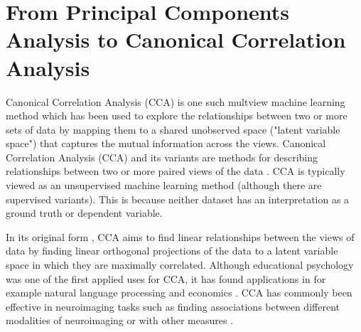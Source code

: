 

\section{From Principal Components Analysis to Canonical Correlation Analysis}

Canonical Correlation Analysis (CCA) \cite{hotelling1935canonical} is one such multview machine learning method which has been used to explore the relationships between two or more sets of data by mapping them to a shared unobserved space ("latent variable space") that captures the mutual information across the views. Canonical Correlation Analysis (CCA) and its variants are methods for describing relationships between two or more paired views of the data \cite{uurtio2017tutorial}. CCA is typically viewed as an unsupervised machine learning method (although there are supervised variants). This is because neither dataset has an interpretation as a ground truth or dependent variable.

In its original form \cite{hotelling1935canonical}, CCA aims to find linear relationships between the views of data by finding linear orthogonal projections of the data to a latent variable space in which they are maximally correlated. Although educational psychology was one of the first applied uses for CCA, it has found applications in for example natural language processing \cite{dhillon2011multi} and economics \cite{vinod1978survey}. CCA has commonly been effective in neuroimaging tasks such as finding associations between different modalities of neuroimaging or with other measures \cite{wang2018finding}.

